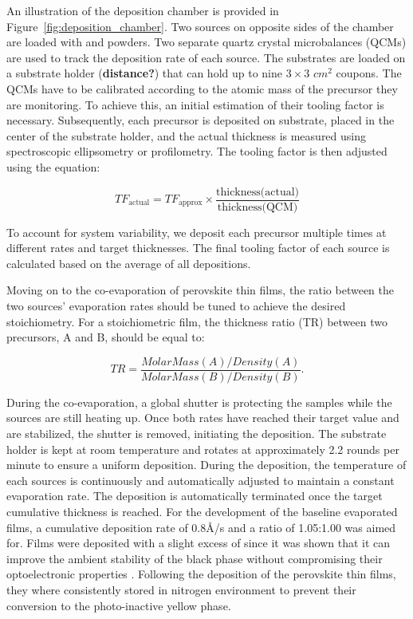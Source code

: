 An illustration of the deposition chamber is provided in Figure~\ref{fig:deposition_chamber}. Two sources on opposite sides of the chamber are loaded with  and  powders. Two separate quartz crystal microbalances (QCMs) are used to track the deposition rate of each source. The substrates are loaded on a substrate holder (\textbf{distance?}) that can hold up to nine $3\times 3$ $cm^2$ coupons. The QCMs have to be calibrated according to the atomic mass of the precursor they are monitoring. To achieve this, an initial estimation of their tooling factor is necessary. Subsequently, each precursor is deposited on  substrate, placed in the center of the substrate holder, and the actual thickness is measured using spectroscopic ellipsometry or profilometry. The tooling factor is then adjusted using the equation: 

\begin{equation}
    TF_{\text{actual}} = TF_{\text{approx}} \times \frac{\text{thickness(actual)}}{\text{thickness(QCM)}}
\end{equation}

To account for system variability, we deposit each precursor multiple times at different rates and target thicknesses. The final tooling factor of each source is calculated based on the average of all depositions.


Moving on to the co-evaporation of perovskite thin films, the ratio between the two sources' evaporation rates should be tuned to achieve the desired stoichiometry. For a stoichiometric film, the thickness ratio (TR) between two precursors, A and B, should be equal to: 

\begin{equation}
    TR = \frac{MolarMass(A)/Density(A)}{MolarMass(B)/Density(B)}.
\end{equation}

During the co-evaporation, a global shutter is protecting the samples while the sources are still heating up. Once both rates have reached their target value and are stabilized, the shutter is removed, initiating the deposition. The substrate holder is kept at room temperature and rotates at approximately 2.2 rounds per minute to ensure a uniform deposition. During the deposition, the temperature of each sources is continuously and automatically adjusted to maintain a constant evaporation rate. The deposition is automatically terminated once the target cumulative thickness is reached. For the development of the baseline evaporated films, a cumulative deposition rate of 0.8{\AA}/s and a  ratio of 1.05:1.00 was aimed for. Films were deposited with a slight excess of  since it was shown that it can improve the ambient stability of the black phase without compromising their optoelectronic properties \cite{Ma2017TheCells}. Following the deposition of the perovskite thin films, they where consistently stored in nitrogen environment to prevent their conversion to the photo-inactive yellow phase.


